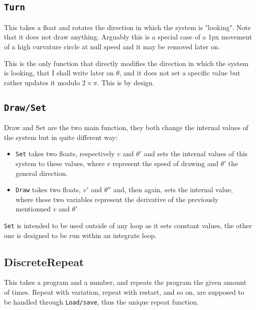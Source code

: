 \documentclass[hidelinks,10pt]{article}
\begin{document}
    \subsection{\texttt{Turn}}

    This takes a float and rotates the direction in which the system
    is "looking". Note that it does not draw anything. Arguably this is a
    special case of a 1px movement of a high curvature circle at null speed and
    it may be removed later on.

    This is the only function that directly modifies the direction in which the
    system is looking, that I shall write later on $\theta$, and it does not
    set a specific value but rather updates it modulo $2\times\pi$. This is by
    design.

    \subsection{\texttt{Draw/Set}}

    Draw and Set are the two main function, they both change the internal
    values of the system but in quite different way:

    \begin{itemize}
     \item \texttt{Set} takes two floats, respectively $v$ and $\theta'$ and
         sets the internal values of this system to these values, where $v$
         represent the speed of drawing and $\theta'$ the general direction.
     \item \texttt{Draw} takes two floats, $v'$ and $\theta''$ and, then again,
         sets the internal value, where these two variables represent the
         derivative of the previously mentionned $v$ and $\theta'$
    \end{itemize}

    \texttt{Set} is intended to be used outside of any loop as it sets constant
    values, the other one is designed to be run within an integrate loop.

    \subsection{DiscreteRepeat}

    This takes a program and a number, and repeats the program the given amount
    of times. Repeat with variation, repeat with restart, and so on, are
    supposed to be handled through \texttt{Load/save}, thus the unique repeat
    function.
\end{document}
